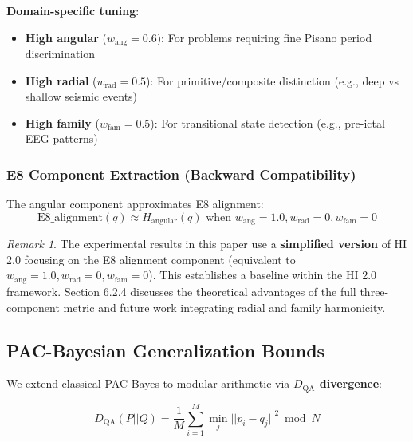 \documentclass[11pt]{article}
\theoremstyle{remark}
\newtheorem{remark}[theorem]{Remark}
\begin{document}
\textbf{Domain-specific tuning}:
\begin{itemize}
\item \textbf{High angular} ($w_{\text{ang}}=0.6$): For problems requiring fine Pisano period discrimination
\item \textbf{High radial} ($w_{\text{rad}}=0.5$): For primitive/composite distinction (e.g., deep vs shallow seismic events)
\item \textbf{High family} ($w_{\text{fam}}=0.5$): For transitional state detection (e.g., pre-ictal EEG patterns)
\end{itemize}

\subsubsection{E8 Component Extraction (Backward Compatibility)}

The angular component approximates E8 alignment:
\begin{equation}
\text{E8\_alignment}(q) \approx H_{\text{angular}}(q) \text{ when } w_{\text{ang}} = 1.0, w_{\text{rad}} = 0, w_{\text{fam}} = 0
\end{equation}

\begin{remark}
The experimental results in this paper use a \textbf{simplified version} of HI 2.0 focusing on the E8 alignment component (equivalent to $w_{\text{ang}}=1.0, w_{\text{rad}}=0, w_{\text{fam}}=0$). This establishes a baseline within the HI 2.0 framework. Section 6.2.4 discusses the theoretical advantages of the full three-component metric and future work integrating radial and family harmonicity.
\end{remark}

\subsection{PAC-Bayesian Generalization Bounds}

We extend classical PAC-Bayes to modular arithmetic via \textbf{$D_{\text{QA}}$ divergence}:

\begin{equation}
D_{\text{QA}}(P||Q) = \frac{1}{M} \sum_{i=1}^{M} \min_{j} ||p_i - q_j||^2 \bmod N
\end{equation}
\end{document}
